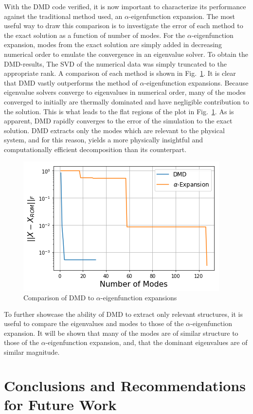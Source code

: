 \documentclass[12pt]{article}
\newcommand{\LFI}[1]{\label{fi:#1}}
\newcommand{\FI}[1]{Fig.~\ref{fi:#1}}
\newcommand{\bfg}{\begin{figure}}
\newcommand{\efg}{\end{figure}}
\begin{document}
With the DMD code verified, it is now important to characterize its performance 
 against the traditional method used, an $\alpha$-eigenfunction expansion.
The most useful way to draw this comparison is to investigate the error of each 
 method to the exact solution as a function of number of modes.
For the $\alpha$-eigenfunction expansion, modes from the exact solution are 
 simply added in decreasing numerical order to emulate the convergence in an eigenvalue solver.
To obtain the DMD-results, The SVD of the numerical data was simply truncated 
 to the appropriate rank.
A comparison of each method is shown in \FI{comp}. It is clear that DMD vastly 
 outperforms the method of $\alpha$-eigenfunction expansions.
Because eigenvalue solvers converge to eigenvalues in numerical order, many of 
 the modes converged to initially are thermally dominated and have negligible 
 contribution to the solution. 
This is what leads to the flat regions of the plot in \FI{comp}. 
As is apparent, DMD rapidly converges to the error of the simulation to the exact solution.
DMD extracts only the modes which are relevant to the physical system, and for 
 this reason, yields a more physically insightful and computationally 
 efficient decomposition than its counterpart.

\bfg[!htb] \centering
	\includegraphics[scale=0.5]{method_comparison.png}
	\caption{Comparison of DMD to $\alpha$-eigenfunction expansions}
	\LFI{comp}
\efg

To further showcase the ability of DMD to extract only relevant structures, it 
 is useful to compare the eigenvalues and modes to those of the 
 $\alpha$-eigenfunction expansion.
It will be shown that many of the modes are of similar structure to those of 
	the $\alpha$-eigenfunction expansion, and, that the dominant eigenvalues are 
	of similar magnitude.

\section{Conclusions and Recommendations for Future Work}


\end{document}
